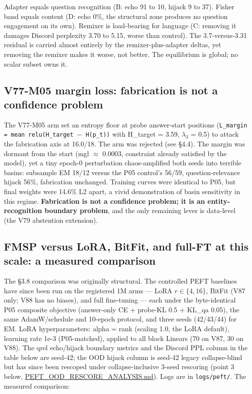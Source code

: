 \documentclass[11pt]{article}
\begin{document}
Adapter equals question recognition (B: echo 91 to 10, hijack 9 to 37). Fisher band equals content (D: echo 0\%, the structural zone produces no question engagement on its own). Remixer is load-bearing for language (C: removing it damages Discord perplexity 3.70 to 5.15, worse than control). The 3.7-versus-3.31 residual is carried almost entirely by the remixer-plus-adapter deltas, yet removing the remixer makes it worse, not better. The equilibrium is global; no scalar subset owns it.

\subsection{V77-M05 margin loss: fabrication is not a confidence problem}

The V77-M05 arm set an entropy floor at probe answer-start positions (\texttt{L\_margin = mean relu(H\_target $-$ H(p\_t))} with H\_target = 3.59, $\lambda_3$ = 0.5) to attack the fabrication axis at 16.0/18. The arm was rejected (see \S4.4). The margin was dormant from the start (mgl $\approx$ 0.0003, constraint already satisfied by the model), yet a tiny epoch-0 perturbation chaos-amplified both seeds into terrible basins: subsample EM 18/12 versus the P05 control's 56/59, question-relevance hijack 56\%, fabrication unchanged. Training curves were identical to P05, but final weights were 14.6\% L2 apart, a vivid demonstration of basin sensitivity in this regime. \textbf{Fabrication is not a confidence problem; it is an entity-recognition boundary problem}, and the only remaining lever is data-level (the V79 abstention extension).

\subsection{FMSP versus LoRA, BitFit, and full-FT at this scale: a measured comparison}

The \S3.8 comparison was originally structural. The controlled PEFT baselines have since been run on the registered 1M arms --- LoRA $r \in \{4,16\}$, BitFit (V87 only; V88 has no biases), and full fine-tuning --- each under the byte-identical P05 composite objective (answer-only CE + probe-KL 0.5 + KL\_qa 0.05), the same AdamW/schedule and 10-epoch protocol, and three seeds (42/43/44) for EM. LoRA hyperparameters: alpha = rank (scaling 1.0, the LoRA default), learning rate 1e-3 (P05-matched), applied to all block Linears (70 on V87, 30 on V88). The qrel echo/hijack boundary metrics and the Discord PPL column in the table below are seed-42; the OOD hijack column is seed-42 legacy collapse-blind but has since been rescoped under collapse-inclusive 3-seed rescoring (point 3 below, \href{https://github.com/llaa33219/MicroMixer-4/blob/4bb630413dfa58ef3141291e121ab8c006d03235/PEFT_OOD_RESCORE_ANALYSIS.md}{PEFT\_OOD\_RESCORE\_ANALYSIS.md}). Logs are in \texttt{logs/peft/}. The measured comparison:
\end{document}
